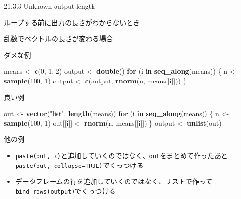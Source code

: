 \documentclass[ignorenonframetext,]{beamer}
\newenvironment{Shaded}{\begin{snugshade}}{\end{snugshade}}
\newcommand{\KeywordTok}[1]{\textcolor[rgb]{0.13,0.29,0.53}{\textbf{#1}}}
\newcommand{\DecValTok}[1]{\textcolor[rgb]{0.00,0.00,0.81}{#1}}
\newcommand{\StringTok}[1]{\textcolor[rgb]{0.31,0.60,0.02}{#1}}
\newcommand{\ControlFlowTok}[1]{\textcolor[rgb]{0.13,0.29,0.53}{\textbf{#1}}}
\newcommand{\NormalTok}[1]{#1}
\providecommand{\tightlist}{%
  \setlength{\itemsep}{0pt}\setlength{\parskip}{0pt}}
\begin{document}
\begin{frame}{21.3.3 Unknown output length}

ループする前に出力の長さがわからないとき

\end{frame}

\begin{frame}[fragile]{乱数でベクトルの長さが変わる場合}

\begin{block}{ダメな例}

\begin{Shaded}
\begin{Highlighting}[]
\NormalTok{means <-}\StringTok{ }\KeywordTok{c}\NormalTok{(}\DecValTok{0}\NormalTok{, }\DecValTok{1}\NormalTok{, }\DecValTok{2}\NormalTok{)}
\NormalTok{output <-}\StringTok{ }\KeywordTok{double}\NormalTok{()}
\ControlFlowTok{for}\NormalTok{ (i }\ControlFlowTok{in} \KeywordTok{seq_along}\NormalTok{(means)) \{}
\NormalTok{  n <-}\StringTok{ }\KeywordTok{sample}\NormalTok{(}\DecValTok{100}\NormalTok{, }\DecValTok{1}\NormalTok{)}
\NormalTok{  output <-}\StringTok{ }\KeywordTok{c}\NormalTok{(output, }\KeywordTok{rnorm}\NormalTok{(n, means[[i]]))}
\NormalTok{\}}
\end{Highlighting}
\end{Shaded}

\end{block}

\end{frame}

\begin{frame}[fragile]{良い例}

\begin{Shaded}
\begin{Highlighting}[]
\NormalTok{out <-}\StringTok{ }\KeywordTok{vector}\NormalTok{(}\StringTok{"list"}\NormalTok{, }\KeywordTok{length}\NormalTok{(means))}
\ControlFlowTok{for}\NormalTok{ (i }\ControlFlowTok{in} \KeywordTok{seq_along}\NormalTok{(means)) \{}
\NormalTok{  n <-}\StringTok{ }\KeywordTok{sample}\NormalTok{(}\DecValTok{100}\NormalTok{, }\DecValTok{1}\NormalTok{)}
\NormalTok{  out[[i]] <-}\StringTok{ }\KeywordTok{rnorm}\NormalTok{(n, means[[i]])}
\NormalTok{\}}
\NormalTok{output <-}\StringTok{ }\KeywordTok{unlist}\NormalTok{(out)}
\end{Highlighting}
\end{Shaded}

\begin{block}{他の例}

\begin{itemize}
\tightlist
\item
  \texttt{paste(out,\ x)}と追加していくのではなく、\texttt{out}をまとめて作ったあと\texttt{paste(out,\ collapse=TRUE)}でくっつける
\item
  データフレームの行を追加していくのではなく、リストで作って\texttt{bind\_rows(output)}でくっつける
\end{itemize}

\end{block}

\end{frame}
\end{document}
